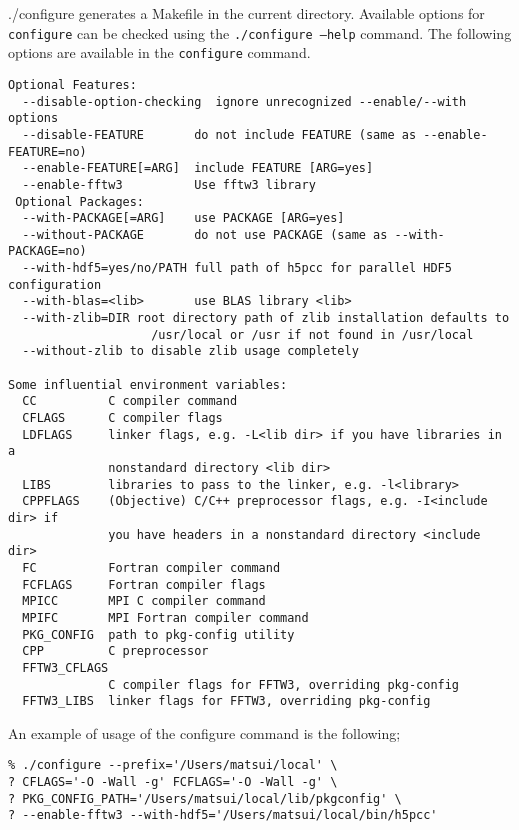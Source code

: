 {./configure} generates a Makefile in the current directory.  Available options for {\tt configure} can be checked using the {\tt ./configure --help} command. The following options are available in the {\tt configure} command.
%
{\small
\begin{verbatim}
Optional Features:
  --disable-option-checking  ignore unrecognized --enable/--with options
  --disable-FEATURE       do not include FEATURE (same as --enable-FEATURE=no)
  --enable-FEATURE[=ARG]  include FEATURE [ARG=yes]
  --enable-fftw3          Use fftw3 library 
 Optional Packages:
  --with-PACKAGE[=ARG]    use PACKAGE [ARG=yes]
  --without-PACKAGE       do not use PACKAGE (same as --with-PACKAGE=no)
  --with-hdf5=yes/no/PATH full path of h5pcc for parallel HDF5 configuration
  --with-blas=<lib>       use BLAS library <lib>
  --with-zlib=DIR root directory path of zlib installation defaults to
                    /usr/local or /usr if not found in /usr/local
  --without-zlib to disable zlib usage completely

Some influential environment variables:
  CC          C compiler command
  CFLAGS      C compiler flags
  LDFLAGS     linker flags, e.g. -L<lib dir> if you have libraries in a
              nonstandard directory <lib dir>
  LIBS        libraries to pass to the linker, e.g. -l<library>
  CPPFLAGS    (Objective) C/C++ preprocessor flags, e.g. -I<include dir> if
              you have headers in a nonstandard directory <include dir>
  FC          Fortran compiler command
  FCFLAGS     Fortran compiler flags
  MPICC       MPI C compiler command
  MPIFC       MPI Fortran compiler command
  PKG_CONFIG  path to pkg-config utility
  CPP         C preprocessor
  FFTW3_CFLAGS
              C compiler flags for FFTW3, overriding pkg-config
  FFTW3_LIBS  linker flags for FFTW3, overriding pkg-config

\end{verbatim}
}
%
An example of usage of the configure command is the following;
\begin{verbatim}
% ./configure --prefix='/Users/matsui/local' \
? CFLAGS='-O -Wall -g' FCFLAGS='-O -Wall -g' \
? PKG_CONFIG_PATH='/Users/matsui/local/lib/pkgconfig' \
? --enable-fftw3 --with-hdf5='/Users/matsui/local/bin/h5pcc'

\end{verbatim}

